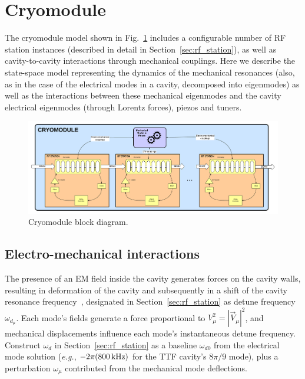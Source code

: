 \documentclass[a4paper,12pt]{article}
\begin{document}
\clearpage
\newpage

\section{Cryomodule}
\label{sec:cryomodule}

The cryomodule model shown in Fig.~\ref{fig:Cryomodule_block_diagram} includes a configurable number of RF station instances (described in detail in Section~\ref{sec:rf_station}), as well as cavity-to-cavity interactions through mechanical couplings. Here we describe the state-space model representing the dynamics of the mechanical resonances (also, as in the case of the electrical modes in a cavity, decomposed into eigenmodes) as well as the interactions between these mechanical eigenmodes and the cavity electrical eigenmodes (through Lorentz forces), piezos and tuners.

\begin{figure}
\centering
\includegraphics[scale=0.3]{../figures/Cryomodule_block_diagram.png}
\caption{Cryomodule block diagram.}
\label{fig:Cryomodule_block_diagram}
\end{figure}

\subsection{Electro-mechanical interactions}

The presence of an EM field inside the cavity generates forces on the cavity walls, resulting in deformation of the cavity and subsequently in a shift of the cavity resonance frequency~\cite{ref:delayen}, designated in Section~\ref{sec:rf_station} as detune frequency $\omega_{d_\mu}$. Each mode's fields generate a force proportional to $V_\mu^2 = |\vec V_\mu|^2$, and mechanical displacements influence each mode's instantaneous detune frequency.  Construct $\omega_d$ in Section~\ref{sec:rf_station} as a baseline $\omega_{d0}$ from the electrical mode solution ({\it e.g.}, $-2\pi (800\thinspace {\rm kHz})$ for the TTF cavity's $8\pi/9$ mode), plus a perturbation $\omega_{\mu}$ contributed from the mechanical mode deflections.
\end{document}
